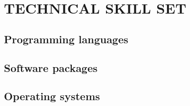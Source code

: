 \documentclass[]{deedy-resume-openfont}
\begin{document}
\begin{minipage}[t]{0.33\textwidth}

\section{TECHNICAL SKILL SET}

\subsection{Programming languages}
\sectionsep

\subsection{Software packages}
\sectionsep

\subsection{Operating systems}




%
%

\end{minipage} 
\hfill
\end{document}
